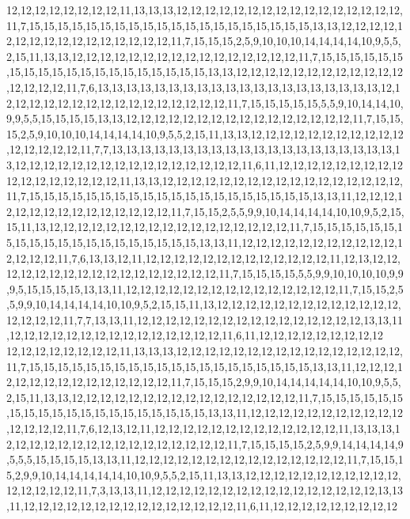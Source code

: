 12,12,12,12,12,12,12,12,11,13,13,13,12,12,12,12,12,12,12,12,12,12,12,12,12,12,12,12,11,7,15,15,15,15,15,15,15,15,15,15,15,15,15,15,15,15,15,15,15,15,13,13,12,12,12,12,12,12,12,12,12,12,12,12,12,12,12,12,11,7,15,15,15,2,5,9,10,10,10,14,14,14,14,10,9,5,5,2,15,11,13,13,12,12,12,12,12,12,12,12,12,12,12,12,12,12,12,12,11,7,15,15,15,15,15,15,15,15,15,15,15,15,15,15,15,15,15,15,15,15,13,13,12,12,12,12,12,12,12,12,12,12,12,12,12,12,12,12,11,7,6,13,13,13,13,13,13,13,13,13,13,13,13,13,13,13,13,13,13,13,13,12,12,12,12,12,12,12,12,12,12,12,12,12,12,12,12,12,11,7,15,15,15,15,15,5,5,9,10,14,14,10,9,9,5,5,15,15,15,15,13,13,12,12,12,12,12,12,12,12,12,12,12,12,12,12,12,12,11,7,15,15,15,2,5,9,10,10,10,14,14,14,14,10,9,5,5,2,15,11,13,13,12,12,12,12,12,12,12,12,12,12,12,12,12,12,12,12,11,7,7,13,13,13,13,13,13,13,13,13,13,13,13,13,13,13,13,13,13,13,13,13,12,12,12,12,12,12,12,12,12,12,12,12,12,12,12,12,11,6,11,12,12,12,12,12,12,12,12,12
12,12,12,12,12,12,12,12,11,13,13,12,12,12,12,12,12,12,12,12,12,12,12,12,12,12,12,12,11,7,15,15,15,15,15,15,15,15,15,15,15,15,15,15,15,15,15,15,15,15,13,13,11,12,12,12,12,12,12,12,12,12,12,12,12,12,12,12,11,7,15,15,2,5,5,9,9,10,14,14,14,14,10,10,9,5,2,15,15,11,13,12,12,12,12,12,12,12,12,12,12,12,12,12,12,12,12,12,11,7,15,15,15,15,15,15,15,15,15,15,15,15,15,15,15,15,15,15,15,15,13,13,11,12,12,12,12,12,12,12,12,12,12,12,12,12,12,12,11,7,6,13,13,12,11,12,12,12,12,12,12,12,12,12,12,12,12,12,11,12,13,12,12,12,12,12,12,12,12,12,12,12,12,12,12,12,12,12,11,7,15,15,15,15,5,5,9,9,10,10,10,10,9,9,9,5,15,15,15,15,13,13,11,12,12,12,12,12,12,12,12,12,12,12,12,12,12,12,11,7,15,15,2,5,5,9,9,10,14,14,14,14,10,10,9,5,2,15,15,11,13,12,12,12,12,12,12,12,12,12,12,12,12,12,12,12,12,12,11,7,7,13,13,11,12,12,12,12,12,12,12,12,12,12,12,12,12,12,12,12,13,13,11,12,12,12,12,12,12,12,12,12,12,12,12,12,12,12,11,6,11,12,12,12,12,12,12,12,12,12
12,12,12,12,12,12,12,12,11,13,13,13,12,12,12,12,12,12,12,12,12,12,12,12,12,12,12,12,11,7,15,15,15,15,15,15,15,15,15,15,15,15,15,15,15,15,15,15,15,15,13,13,11,12,12,12,12,12,12,12,12,12,12,12,12,12,12,12,11,7,15,15,15,2,9,9,10,14,14,14,14,14,10,10,9,5,5,2,15,11,13,13,12,12,12,12,12,12,12,12,12,12,12,12,12,12,12,12,11,7,15,15,15,15,15,15,15,15,15,15,15,15,15,15,15,15,15,15,15,15,13,13,11,12,12,12,12,12,12,12,12,12,12,12,12,12,12,12,11,7,6,12,13,12,11,12,12,12,12,12,12,12,12,12,12,12,12,12,11,13,13,13,12,12,12,12,12,12,12,12,12,12,12,12,12,12,12,12,11,7,15,15,15,15,2,5,9,9,14,14,14,14,9,5,5,5,15,15,15,15,13,13,11,12,12,12,12,12,12,12,12,12,12,12,12,12,12,12,11,7,15,15,15,2,9,9,10,14,14,14,14,14,10,10,9,5,5,2,15,11,13,13,12,12,12,12,12,12,12,12,12,12,12,12,12,12,12,12,11,7,3,13,13,11,12,12,12,12,12,12,12,12,12,12,12,12,12,12,12,12,13,13,11,12,12,12,12,12,12,12,12,12,12,12,12,12,12,12,11,6,11,12,12,12,12,12,12,12,12,12
